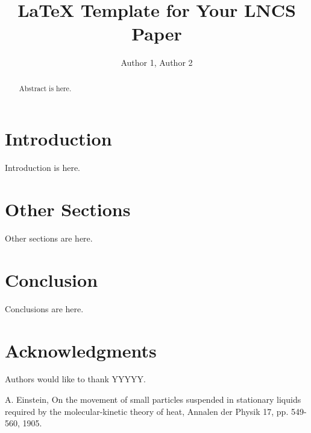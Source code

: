 \documentclass{llncs}
\begin{document}
\title{LaTeX Template for Your LNCS Paper}

\author{Author 1, Author 2}

\maketitle

\begin{abstract}

Abstract is here.

\end{abstract}

\section{Introduction}\label{sec:Introduction}

Introduction is here.

\section{Other Sections}\label{sec:Others}

Other sections are here. 


\section{Conclusion}\label{sec:Conclusion}

Conclusions are here.

\section*{Acknowledgments}\label{sec:Acknowledgments}

Authors would like to thank YYYYY.

\begin{thebibliography}{1}

A. Einstein, On the movement of small particles suspended in stationary liquids required by the molecular-kinetic theory of heat, Annalen der Physik 17, pp. 549-560, 1905.

\end{thebibliography}
\end{document}
